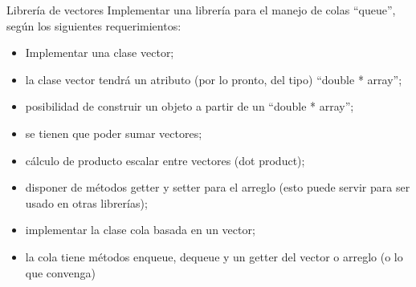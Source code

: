 \documentclass[xcolor=table,spanish,9pt]{beamer}
\begin{document}
\begin{frame}[fragile]
  \begin{block}{Librería de vectores}
    Implementar una librería para el manejo de colas ``queue'', según los siguientes requerimientos:
    \begin{itemize}
      \item Implementar una clase vector;
      \item la clase vector tendrá un atributo (por lo pronto, del tipo) ``double * array'';
      \item posibilidad de construir un objeto a partir de un ``double * array'';
      \item se tienen que poder sumar vectores;
      \item cálculo de producto escalar entre vectores (dot product);
      \item disponer de métodos getter y setter para el arreglo (esto puede servir para ser usado en otras librerías);
      \item implementar la clase cola basada en un vector;
      \item la cola tiene métodos enqueue, dequeue y un getter del vector o arreglo (o lo que convenga)
    \end{itemize}
  \end{block}
\end{frame}
\end{document}
